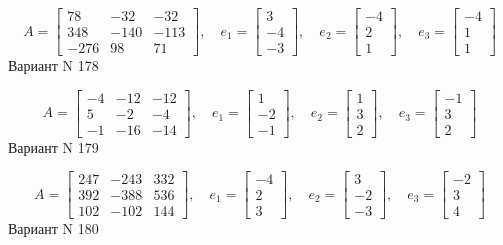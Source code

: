 \documentclass[11pt]{report}
\begin{document}
$$A = \left[\begin{matrix}78 & -32 & -32\\348 & -140 & -113\\-276 & 98 & 71\end{matrix}\right],\quad e_1 = \left[\begin{matrix}3\\-4\\-3\end{matrix}\right],\quad e_2 = \left[\begin{matrix}-4\\2\\1\end{matrix}\right],\quad e_3 = \left[\begin{matrix}-4\\1\\1\end{matrix}\right]$$Вариант N 178

$$A = \left[\begin{matrix}-4 & -12 & -12\\5 & -2 & -4\\-1 & -16 & -14\end{matrix}\right],\quad e_1 = \left[\begin{matrix}1\\-2\\-1\end{matrix}\right],\quad e_2 = \left[\begin{matrix}1\\3\\2\end{matrix}\right],\quad e_3 = \left[\begin{matrix}-1\\3\\2\end{matrix}\right]$$Вариант N 179

$$A = \left[\begin{matrix}247 & -243 & 332\\392 & -388 & 536\\102 & -102 & 144\end{matrix}\right],\quad e_1 = \left[\begin{matrix}-4\\2\\3\end{matrix}\right],\quad e_2 = \left[\begin{matrix}3\\-2\\-3\end{matrix}\right],\quad e_3 = \left[\begin{matrix}-2\\3\\4\end{matrix}\right]$$Вариант N 180
\end{document}
